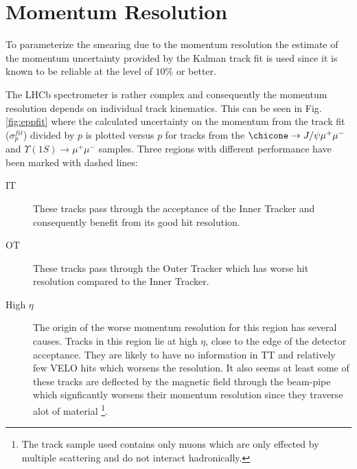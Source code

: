 \section{Momentum Resolution}
\label{sec:ep}
To parameterize the smearing due to the momentum resolution the
estimate of the momentum uncertainty provided by the Kalman track fit
is used since it is known to be reliable at the level of $10 \%$ or better.  

%
The LHCb spectrometer is rather complex and consequently the momentum
resolution depends on individual track kinematics. This can be seen in
Fig.  \ref{fig:eppfit} where the calculated uncertainty on the momentum from the
track fit ($\sigma^{fit}_{p}$) divided by $p$ is plotted versus $p$ for tracks from the
$\chicone \rightarrow J/\psi \mu^+ \mu^-$ and $\Upsilon(1S) \rightarrow
\mu^+ \mu^-$ samples. Three regions with different performance have been marked with dashed lines:
\begin{description}
\item[IT] These tracks pass through
  the acceptance of the Inner Tracker and consequently benefit from
  its good hit resolution.
\item[OT] These tracks pass through the Outer Tracker which has worse
  hit resolution compared to the Inner Tracker.
\item[High $\eta$] The origin of the worse momentum resolution for this region
  has several causes. Tracks in this region lie at high $\eta$, close to
  the edge of the detector acceptance. They are likely to have no
  information in TT and relatively few VELO hits which worsens the
  resolution. It also seems at least some of these tracks are deflected
  by the magnetic field through the beam-pipe which signficantly worsens their
  momentum resolution since they traverse alot of material
  \footnote{The track sample used contains only muons which are only
    effected by multiple scattering and do not interact hadronically.}. 
\end{description}
%
